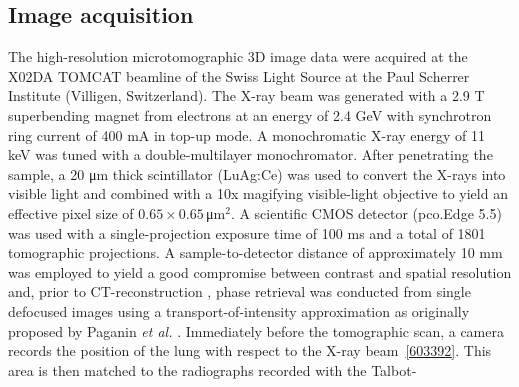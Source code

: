 \subsection{Image acquisition}\label{sec:acquisition}
The high-resolution microtomographic 3D image data were acquired at the X02DA TOMCAT beamline of the Swiss Light Source at the Paul Scherrer Institute (Villigen, Switzerland). The X-ray beam was generated with a 2.9 T superbending magnet from electrons at an energy of 2.4 GeV with synchrotron ring current of 400 mA in top-up mode. A monochromatic X-ray energy of 11 keV was tuned with a double-multilayer monochromator. After penetrating the sample, a 20 μm thick scintillator (LuAg:Ce) was used to convert the X-rays into visible light and combined with a 10x magifying visible-light objective to yield an effective pixel size of $0.65 \times 0.65\,$μm$^2$. A scientific CMOS detector (pco.Edge 5.5) was used with a single-projection exposure time of 100 ms and a total of 1801 tomographic projections. A sample-to-detector distance of approximately 10 mm was employed to yield a good compromise between contrast and spatial resolution and, prior to CT-reconstruction \cite{Marone2012}, phase retrieval was conducted from single defocused images using a transport-of-intensity approximation as originally proposed by Paganin \textit{et al.} \cite{Paganin2002}. Immediately before the tomographic scan, a camera records the position of the lung with respect to the X-ray beam~\ref{603392}. This area is then matched to the radiographs recorded with the Talbot-

